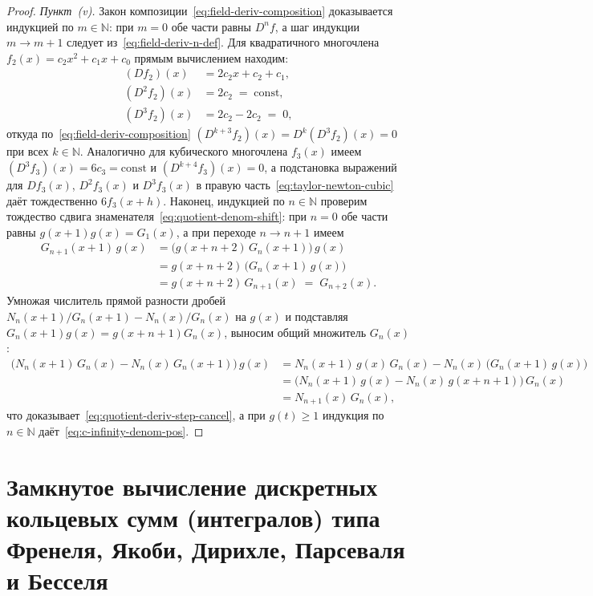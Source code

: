 \documentclass[11pt,a4paper]{article}
\theoremstyle{plain}
\theoremstyle{definition}
\begin{document}
\begin{proof}
\emph{Пункт~(v).} Закон композиции~\eqref{eq:field-deriv-composition} доказывается индукцией по $m \in \mathbb{N}$: при $m = 0$ обе части равны $D^n f$, а шаг индукции $m \to m + 1$ следует из~\eqref{eq:field-deriv-n-def}. Для квадратичного многочлена $f_2(x) = c_2 x^2 + c_1 x + c_0$ прямым вычислением находим:
\begin{align*}
  (Df_2)(x) &= 2c_2 x + c_2 + c_1, \\
  (D^2 f_2)(x) &= 2c_2 \;=\; \mathrm{const}, \\
  (D^3 f_2)(x) &= 2c_2 - 2c_2 \;=\; 0,
\end{align*}
откуда по~\eqref{eq:field-deriv-composition} $(D^{k+3} f_2)(x) = D^k(D^3 f_2)(x) = 0$ при всех $k \in \mathbb{N}$. Аналогично для кубического многочлена $f_3(x)$ имеем $(D^3 f_3)(x) = 6c_3 = \mathrm{const}$ и $(D^{k+4} f_3)(x) = 0$, а подстановка выражений для $Df_3(x)$, $D^2 f_3(x)$ и $D^3 f_3(x)$ в правую часть~\eqref{eq:taylor-newton-cubic} даёт тождественно $6 f_3(x+h)$. Наконец, индукцией по $n \in \mathbb{N}$ проверим тождество сдвига знаменателя~\eqref{eq:quotient-denom-shift}: при $n = 0$ обе части равны $g(x+1)g(x) = G_1(x)$, а при переходе $n \to n + 1$ имеем
\begin{align*}
  G_{n+1}(x+1)\,g(x) &= \bigl(g(x+n+2)\,G_n(x+1)\bigr)\,g(x) \\
  &= g(x+n+2)\,\bigl(G_n(x+1)\,g(x)\bigr) \\
  &= g(x+n+2)\,G_{n+1}(x) \;=\; G_{n+2}(x).
\end{align*}
Умножая числитель прямой разности дробей $N_n(x+1)/G_n(x+1) - N_n(x)/G_n(x)$ на $g(x)$ и подставляя $G_n(x+1)g(x) = g(x+n+1)G_n(x)$, выносим общий множитель $G_n(x)$:
\begin{align*}
  \bigl(N_n(x+1)\,G_n(x) - N_n(x)\,G_n(x+1)\bigr)\,g(x)
  &= N_n(x+1)\,g(x)\,G_n(x) - N_n(x)\,\bigl(G_n(x+1)\,g(x)\bigr) \\
  &= \bigl(N_n(x+1)\,g(x) - N_n(x)\,g(x+n+1)\bigr)\,G_n(x) \\
  &= N_{n+1}(x)\,G_n(x),
\end{align*}
что доказывает~\eqref{eq:quotient-deriv-step-cancel}, а при $g(t) \ge 1$ индукция по $n \in \mathbb{N}$ даёт~\eqref{eq:c-infinity-denom-pos}.
\end{proof}

\section{Замкнутое вычисление дискретных кольцевых сумм (интегралов) типа Френеля, Якоби, Дирихле, Парсеваля и Бесселя}
\label{sec:integrals-archimedes}
\end{document}
